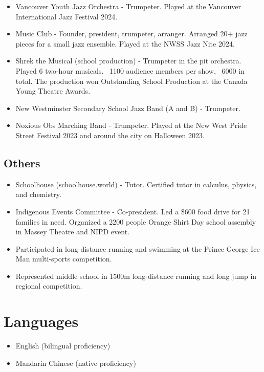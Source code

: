 \documentclass{article}
\begin{document}
\begin{itemize}
	\item Vancouver Youth Jazz Orchestra - Trumpeter. Played at the Vancouver International Jazz Festival 2024.
	\item Music Club - Founder, president, trumpeter, arranger. Arranged 20+ jazz pieces for a small jazz ensemble. Played at the NWSS Jazz Nite 2024.
	\item Shrek the Musical (school production) - Trumpeter in the pit orchestra. Played 6 two-hour musicals. ~1100 audience members per show, ~6000 in total. The production won Outstanding School Production at the Canada Young Theatre Awards.
	\item New Westminster Secondary School Jazz Band (A and B) - Trumpeter.
	\item Noxious Obs Marching Band - Trumpeter. Played at the New West Pride Street Festival 2023 and around the city on Halloween 2023.
\end{itemize}

\subsection*{Others}
\begin{itemize}
	\item Schoolhouse (schoolhouse.world) - Tutor. Certified tutor in calculus, physics, and chemistry.
	\item Indigenous Events Committee - Co-president. Led a \$600 food drive for 21 families in need. Organized a 2200 people Orange Shirt Day school assembly in Massey Theatre and NIPD event.
	\item Participated in long-distance running and swimming at the Prince George Ice Man multi-sports competition.
	\item Represented middle school in 1500m long-distance running and long jump in regional competition.
\end{itemize}

\section*{Languages}

\begin{itemize}
	\item English (bilingual proficiency)
	\item Mandarin Chinese (native proficiency)
\end{itemize}
\end{document}
